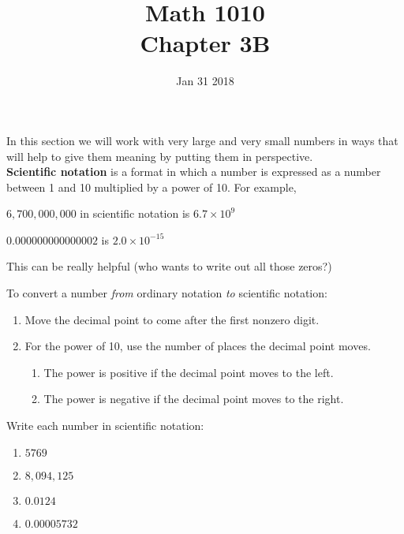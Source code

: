 \documentclass[12pt]{article}
\begin{document}
\title{\bf Math 1010\\Chapter 3B}
\date{\vspace{-0.5in}Jan 31 2018}
\maketitle







In this section we will work with very large and very small numbers in ways that will help to give them meaning by putting them in perspective.\\

\textbf{Scientific notation} is a format in which a number is expressed as a number between 1 and 10 multiplied by a power of 10.  For example,

$6,700,000,000$ in scientific notation is $6.7 \times 10^9$

$0.000000000000002$ is $2.0 \times 10^{-15}$

This can be really helpful (who wants to write out all those zeros?)
\vspace{0.25in}
    		
To convert a number \textit{from} ordinary notation \textit{to} scientific notation:
\begin{enumerate}
\item Move the decimal point to come after the first nonzero digit.
\item For the power of 10, use the number of places the decimal point moves.
\begin{enumerate}
	\item The power is positive if the decimal point moves to the left.
	\item The power is negative if the decimal point moves to the right.
\end{enumerate}
\end{enumerate}
\vspace{0.25in}


Write each number in scientific notation:
\begin{enumerate}
\item $5769$
\item $8,094,125$
\item $0.0124$
\item $0.00005732$
\end{enumerate}
\vspace{0.25in}
\end{document}
